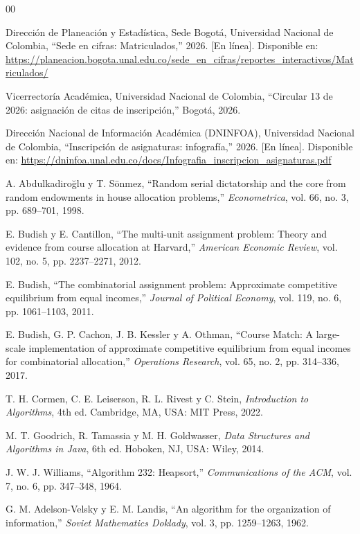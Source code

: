 \documentclass[conference]{IEEEtran}
\begin{document}

\begin{thebibliography}{00}

Dirección de Planeación y Estadística, Sede Bogotá, Universidad Nacional de Colombia,
``Sede en cifras: Matriculados,'' 2026.
[En línea]. Disponible en: \url{https://planeacion.bogota.unal.edu.co/sede_en_cifras/reportes_interactivos/Matriculados/}

Vicerrectoría Académica, Universidad Nacional de Colombia,
``Circular 13 de 2026: asignación de citas de inscripción,'' Bogotá, 2026.

Dirección Nacional de Información Académica (DNINFOA), Universidad Nacional de Colombia,
``Inscripción de asignaturas: infografía,'' 2026.
[En línea]. Disponible en: \url{https://dninfoa.unal.edu.co/docs/Infografia_inscripcion_asignaturas.pdf}

A. Abdulkadiroğlu y T. Sönmez,
``Random serial dictatorship and the core from random endowments in house allocation problems,''
\textit{Econometrica}, vol. 66, no. 3, pp. 689--701, 1998.

E. Budish y E. Cantillon,
``The multi-unit assignment problem: Theory and evidence from course allocation at Harvard,''
\textit{American Economic Review}, vol. 102, no. 5, pp. 2237--2271, 2012.

E. Budish,
``The combinatorial assignment problem: Approximate competitive equilibrium from equal incomes,''
\textit{Journal of Political Economy}, vol. 119, no. 6, pp. 1061--1103, 2011.

E. Budish, G. P. Cachon, J. B. Kessler y A. Othman,
``Course Match: A large-scale implementation of approximate competitive equilibrium from equal incomes for combinatorial allocation,''
\textit{Operations Research}, vol. 65, no. 2, pp. 314--336, 2017.

T. H. Cormen, C. E. Leiserson, R. L. Rivest y C. Stein,
\textit{Introduction to Algorithms}, 4th ed.
Cambridge, MA, USA: MIT Press, 2022.

M. T. Goodrich, R. Tamassia y M. H. Goldwasser,
\textit{Data Structures and Algorithms in Java}, 6th ed.
Hoboken, NJ, USA: Wiley, 2014.

J. W. J. Williams,
``Algorithm 232: Heapsort,''
\textit{Communications of the ACM}, vol. 7, no. 6, pp. 347--348, 1964.

G. M. Adelson-Velsky y E. M. Landis,
``An algorithm for the organization of information,''
\textit{Soviet Mathematics Doklady}, vol. 3, pp. 1259--1263, 1962.

\end{thebibliography}
\end{document}
